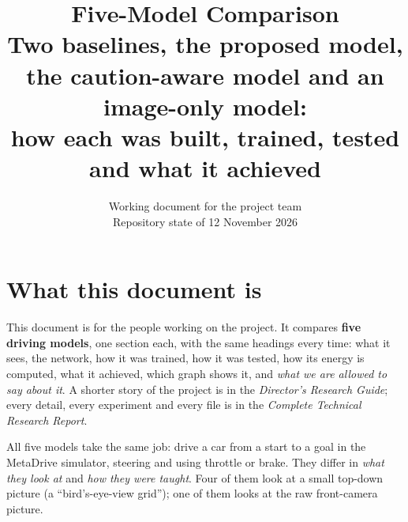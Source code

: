 \documentclass[11pt,a4paper]{article}
\title{\textbf{Five-Model Comparison}\\[4pt]
\large Two baselines, the proposed model, the caution-aware model and an image-only model:\\ how each was built, trained, tested and what it achieved}
\author{Working document for the project team\\ Repository state of 12 November 2026}
\date{}
\begin{document}
\maketitle
\tableofcontents
\newpage

\section{What this document is}
This document is for the people working on the project. It compares \textbf{five driving models}, one section each, with the same headings every time: what it sees, the network, how it was trained, how it was tested, how its energy is computed, what it achieved, which graph shows it, and \emph{what we are allowed to say about it}. A shorter story of the project is in the \emph{Director's Research Guide}; every detail, every experiment and every file is in the \emph{Complete Technical Research Report}.

\begin{plainwords}
All five models take the same job: drive a car from a start to a goal in the MetaDrive simulator, steering and using throttle or brake. They differ in \emph{what they look at} and \emph{how they were taught}. Four of them look at a small top-down picture (a ``bird's-eye-view grid''); one of them looks at the raw front-camera picture.
\end{plainwords}
\end{document}
